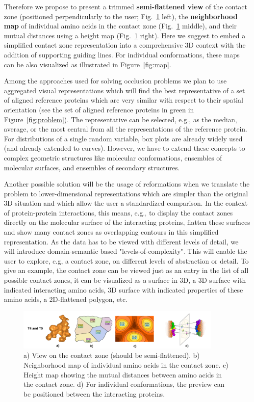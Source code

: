 \documentclass[11pt,a4paper,titlepage,oneside,onecolumn]{article}
\begin{document}
Therefore we propose to present a trimmed \textbf{semi-flattened view} of the contact zone (positioned perpendicularly to the user; Fig.~\ref{fig:preview} left), the \textbf{neighborhood map} of individual amino acids in the contact zone (Fig.~\ref{fig:preview} middle), and their mutual distances using a height map (Fig.~\ref{fig:preview} right).
Here we suggest to embed a simplified contact zone representation into a comprehensive 3D context with the addition of supporting guiding lines.
For individual conformations, these maps can be also visualized as illustrated in Figure~\ref{fig:map}.


Among the approaches used for solving occlusion problems we plan to use aggregated visual representations which will find the best representative of a set of aligned reference proteins which are very similar with respect to their spatial orientation (see the set of aligned reference proteins in green in Figure~\ref{fig:problem}).
The representative can be selected, e.g.,  as the median, average, or the most central from all the representations of the reference protein.
For distributions of a single random variable, box plots are already widely used (and already extended to curves).
However, we have to extend these concepts to complex geometric structures like molecular conformations, ensembles of molecular surfaces, and ensembles of secondary structures.

Another possible solution will be the usage of reformations when we translate the problem to lower-dimensional representations which are simpler than the original 3D situation and which allow the user a standardized comparison. 
In the context of protein-protein interactions, this means, e.g., to display the contact zones directly on the molecular surface of the interacting proteins, flatten these surfaces and show many contact zones as overlapping contours in this simplified representation.
As the data has to be viewed with different levels of detail, we will introduce domain-semantic based "levels-of-complexity". 
This will enable the user to explore, e.g, a contact zone, on different levels of abstraction or detail.
To give an example, the contact zone can be viewed just as an entry in the list of all possible contact zones, it can be visualized as a surface in 3D, a 3D surface with indicated interacting amino acids, 3D surface with indicated properties of these amino acids, a 2D-flattened polygon, etc.

\begin{figure}[ht]
\centering
\includegraphics[width=0.9\textwidth]{pics/preview.png}
\caption{a) View on the contact zone (should be semi-flattened). b) Neighborhood map of individual amino acids in the contact zone. c) Height map showing the mutual distances between amino acids in the contact zone. d) For individual conformations, the preview can be positioned between the interacting proteins.}
\label{fig:preview}
\end{figure}
\end{document}
